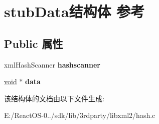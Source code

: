 \hypertarget{structstub_data}{}\section{stub\+Data结构体 参考}
\label{structstub_data}
\subsection*{Public 属性}
\begin{DoxyCompactItemize}
\item 
\mbox{\label{structstub_data_add9ffa78cce79fe7b76f56a720c44238}} 
xml\+Hash\+Scanner {\bfseries hashscanner}
\item 
\mbox{\label{structstub_data_af537ef18074e642c7a7d58de1a9e295f}} 
\hyperlink{interfacevoid}{void} $\ast$ {\bfseries data}
\end{DoxyCompactItemize}


该结构体的文档由以下文件生成\+:\begin{DoxyCompactItemize}
\item 
E\+:/\+React\+O\+S-\/0../sdk/lib/3rdparty/libxml2/hash.\+c\end{DoxyCompactItemize}
